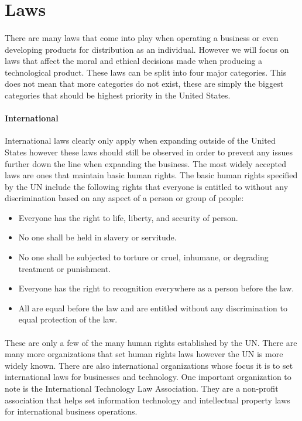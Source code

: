 \documentclass[a4paper,12pt]{article}
\begin{document}
\section*{Laws}
\paragraph{}There are many laws that come into play when operating a business or even developing products for distribution as an individual. However we will focus on laws that affect the moral and ethical decisions made when producing a technological product. These laws can be split into four major categories. This does not mean that more categories do not exist, these are simply the biggest categories that should be highest priority in the United States.
\paragraph{International}International laws clearly only apply when expanding outside of the United States however these laws should still be observed in order to prevent any issues further down the line when expanding the business. The most widely accepted laws are ones that maintain basic human rights. The basic human rights specified by the UN include the following rights that everyone is entitled to without any discrimination based on any aspect of a person or group of people:
	\begin{itemize}
	\item Everyone has the right to life, liberty, and security of person.
	\item No one shall be held in slavery or servitude.
	\item No one shall be subjected to torture or cruel, inhumane, or degrading treatment or punishment.
	\item Everyone has the right to recognition everywhere as a person before the law.
	\item All are equal before the law and are entitled without any discrimination to equal protection of the law.
	\end{itemize}
\paragraph{}These are only a few of the many human rights established by the UN. There are many more organizations that set human rights laws however the UN is more widely known. There are also international organizations whose focus it is to set international laws for businesses and technology. One important organization to note is the International Technology Law Association. They are a non-profit association that helps set information technology and intellectual property laws for international business operations.
\end{document}
